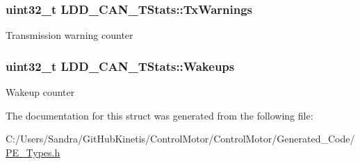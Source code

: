 \subsubsection[{\texorpdfstring{Tx\+Warnings}{TxWarnings}}]{\setlength{\rightskip}{0pt plus 5cm}uint32\+\_\+t L\+D\+D\+\_\+\+C\+A\+N\+\_\+\+T\+Stats\+::\+Tx\+Warnings}\hypertarget{struct_l_d_d___c_a_n___t_stats_a46ea9a5839da88b7e7b596ac34b72f90}{}\label{struct_l_d_d___c_a_n___t_stats_a46ea9a5839da88b7e7b596ac34b72f90}
Transmission warning counter 
\subsubsection[{\texorpdfstring{Wakeups}{Wakeups}}]{\setlength{\rightskip}{0pt plus 5cm}uint32\+\_\+t L\+D\+D\+\_\+\+C\+A\+N\+\_\+\+T\+Stats\+::\+Wakeups}\hypertarget{struct_l_d_d___c_a_n___t_stats_ab59425105119b5b6496a6e0fcc8398d5}{}\label{struct_l_d_d___c_a_n___t_stats_ab59425105119b5b6496a6e0fcc8398d5}
Wakeup counter 

The documentation for this struct was generated from the following file\+:\begin{DoxyCompactItemize}
\item 
C\+:/\+Users/\+Sandra/\+Git\+Hub\+Kinetis/\+Control\+Motor/\+Control\+Motor/\+Generated\+\_\+\+Code/\hyperlink{_p_e___types_8h}{P\+E\+\_\+\+Types.\+h}\end{DoxyCompactItemize}
